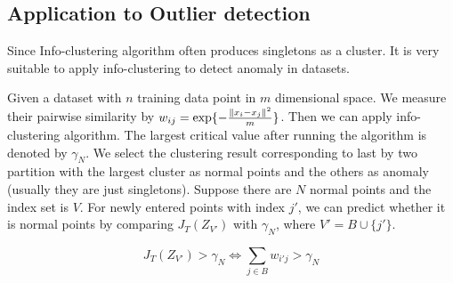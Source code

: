 \documentclass{article}
\begin{document}
\subsection{Application to Outlier detection}
Since Info-clustering algorithm often produces singletons as a cluster. It is very suitable to apply info-clustering to detect anomaly in datasets.

Given a dataset with $n$ training data point in $m$ dimensional space. We measure their pairwise similarity by $w_{ij} = \exp\{-\frac{\lVert x_i - x_j\rVert^2}{m}\} $. Then we can apply info-clustering algorithm. The largest critical value after running the algorithm is denoted by $\gamma_N$. We select the clustering result corresponding to last by two partition with the largest cluster as normal points and the others as anomaly (usually they are just singletons).
Suppose there are $N$ normal points and the index set is $V$. For newly entered points with index $j'$, we can predict whether it is normal points by comparing $J_T(Z_{V'})$ with $\gamma_N$, where $V' = B\cup \{j'\}$.
\begin{proposition}
\begin{equation}
J_{T}(Z_{V'}) > \gamma_N \iff  \sum_{j \in B} w_{i'j} > \gamma_N 
\end{equation}
\end{proposition}	
\end{document}
